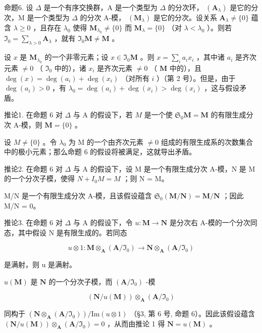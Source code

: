 命题6. 设 \(\Delta\) 是一个有序交换群，A 是一个类型为 \(\Delta\) 的分次环， \((\mathbf{A}_{\lambda})\) 是它的分次，M 是一个类型为 \(\Delta\) 的分次 A-模， \((\mathbf{M}_{\lambda})\) 是它的分次。设关系 \(\mathbf{A}_{\lambda} \neq \{0\}\) 蕴含 \(\lambda \geqslant 0\) ，且存在 \(\lambda_0\) 使得 \(\mathbf{M}_{\lambda_0} \neq \{0\}\) 而 \(\mathbf{M}_{\lambda} = \{0\}\) （对 \(\lambda < \lambda_0\) ）。则若 \(\Im_0 = \sum_{\lambda > 0} \mathbf{A}_{\lambda}\) ，就有 \(\Im_0 \mathbf{M} \neq \mathbf{M}\) 。

设 \(x\) 是 \(\mathbf{M}_{\lambda_0}\) 的一个非零元素；设 \(x \in \mathfrak{I}_0\mathbf{M}\) 。则 \(x = \sum_{i} a_i x_i\) ，其中诸 \(a_i\) 是齐次元素 \(\neq 0\) （ \(\mathfrak{I}_0\) 中的），诸 \(x_i\) 是齐次元素 \(\neq 0\) （ \(\mathbf{M}\) 中的），且 \(\deg(x) = \deg(a_i) + \deg(x_i)\) （对所有 \(i\) ）（第 2 号）。但是，由于 \(\deg(a_i) > 0\) ，有 \(\lambda_0 = \deg(a_i) + \deg(x_i) > \deg(x_i)\) ，这与假设矛盾。

推论1. 在命题 6 对 \(\Delta\) 与 A 的假设下，若 \(M\) 是一个使 \(\mathfrak{S}_0\mathbf{M} = \mathbf{M}\) 的有限生成分次 A-模，则 \(\mathbf{M} = \{0\}\) 。

设 \(M \neq \{0\}\) 。令 \(\lambda_{0}\) 为 M 的一个由齐次元素 \(\neq0\) 组成的有限生成系的次数集合中的极小元素；那么命题 6 的假设将被满足，这就导出矛盾。

推论2. 在命题 6 对 \(\Delta\) 与 A 的假设下，设 M 是一个有限生成分次 A-模，N 是 M 的一个分次子模，使得 \(N + I_{0}M = M\) ；则 N = M。

M/N 是一个有限生成分次 A-模，且该假设蕴含 \(\mathfrak{S}_{0}(\mathbf{M}/\mathbf{N}) = \mathbf{M}/\mathbf{N}\) ；因此 M/N = 0。

推论3. 在命题 6 对 \(\Delta\) 与 A 的假设下，令 \(u: \mathbf{M} \to \mathbf{N}\) 是分次右 A-模的一个分次同态，其中假设 N 是有限生成的。若同态

\[
u \otimes 1: \mathbf {M} \otimes_ {\mathbf {A}} (\mathbf {A} / \mathfrak {I} _ {0}) \rightarrow \mathbf {N} \otimes_ {\mathbf {A}} (\mathbf {A} / \mathfrak {I} _ {0})
\]

是满射，则 u 是满射。

\(u(\mathbf{M})\) 是 \(\mathbf{N}\) 的一个分次子模，而 \((\mathbf{A} / \mathfrak{I}_0)\) -模

\[
(\mathbf {N} / u (\mathbf {M})) \otimes_ {\mathbf {A}} (\mathbf {A} / \mathfrak {I} _ {0})
\]

同构于 \((\mathbf{N} \otimes_{\mathbf{A}} (\mathbf{A} / \mathfrak{I}_0)) / \mathrm{Im}(u \otimes 1)\) （§3, 第 6 号, 命题 6）。因此该假设蕴含 \((\mathbf{N} / u(\mathbf{M})) \otimes_{\mathbf{A}} (\mathbf{A} / \mathfrak{I}_0) = 0\) ，从而由推论 1 得 \(\mathbf{N} = u(\mathbf{M})\) 。

